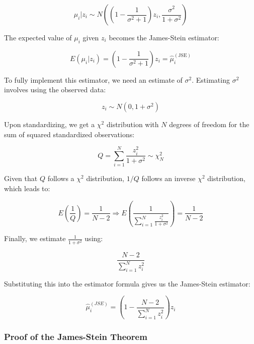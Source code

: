 \begin{equation}
    \mu_i | z_i \sim N\left(\left(1-\frac{1}{\sigma^2+1}\right)z_i, \frac{\sigma^2}{1+\sigma^2}\right)
\end{equation}

The expected value of \(\mu_i\) given \(z_i\) becomes the James-Stein estimator:

\begin{equation}
    E(\mu_i | z_i) = \left(1-\frac{1}{\sigma^2+1}\right)z_i = \hat{\mu}_i^{(\text{JSE})}
\end{equation}

To fully implement this estimator, we need an estimate of \(\sigma^2\). Estimating \(\sigma^2\) involves using the observed data:

\begin{equation}
    z_i\sim N(0,1+\sigma^2)
\end{equation}

Upon standardizing, we get a $\chi^2$ distribution with \(N\) degrees of freedom for the sum of squared standardized observations:

\begin{equation}
    Q = \sum_{i = 1}^{N}{\frac{z_i^2}{1+\sigma^2}} \sim \chi^2_N
\end{equation}

Given that \(Q\) follows a $\chi^2$ distribution, \(1/Q\) follows an inverse $\chi^2$ distribution, which leads to:

\begin{equation}
    E\left(\frac{1}{Q}\right) = \frac{1}{N-2} \Rightarrow E\left(\frac{1}{\sum_{i=1}^{N}{\frac{z_i^2}{1+\sigma^2}}}\right) = \frac{1}{N-2}
\end{equation}

Finally, we estimate \(\frac{1}{1+\sigma^2}\) using:

\begin{equation}
    \frac{N-2}{\sum_{i=1}^{N}{z_i^2}}
\end{equation}

Substituting this into the estimator formula gives us the James-Stein estimator:

\begin{equation}
    \hat{\mu}_i^{(JSE)} = \left(1 - \frac{N-2}{\sum_{i=1}^{N}{z_i^2}}\right) z_i
\end{equation}

\subsubsection{Proof of the James-Stein Theorem}

